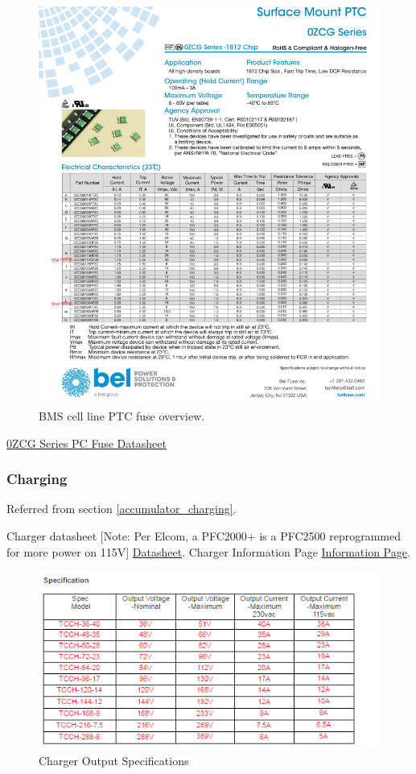 \documentclass{article}
\begin{document}
\begin{figure}[H]
    \includegraphics[width=\linewidth]{0ZCG_fuse_overview.png}
    \caption{BMS cell line PTC fuse overview.}
\end{figure}
\href{http://www.belfuse.com/pdfs/0ZCG.pdf}{0ZCG Series PC Fuse Datasheet}

\subsubsection{Charging}\label{appendix_accumulator_charger}
Referred from section \ref{accumulator_charging}.

Charger datasheet [Note: Per Elcom, a PFC2000+ is a PFC2500 reprogrammed for more power on 115V]
\href{http://www.elconchargers.com/f/PFC2500.pdfF}{Datasheet}. \newline
Charger Information Page
\href{http://www.elconchargers.com/f/PFC2500.pdfF}{Information Page}. \newline
\begin{figure}[H]
	\includegraphics[width=\linewidth]{charger_output}
	\caption{Charger Output Specifications}
\end{figure}
\end{document}
